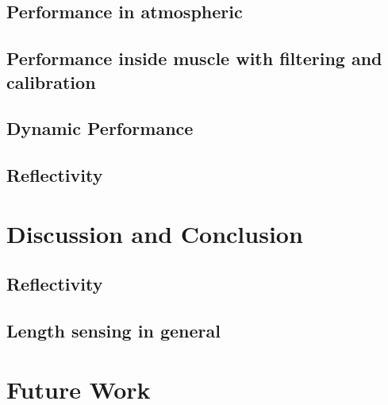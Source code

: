 \documentclass[letterpaper,11pt]{article}
\begin{document}
\subsection{Performance in atmospheric}

\subsection{Performance inside muscle with filtering and calibration}

\subsection{Dynamic Performance}

\subsection{Reflectivity}

\section{Discussion and Conclusion}

\subsection{Reflectivity}

\subsection{Length sensing in general}

\section{Future Work}

\printbibliography
\end{document}
